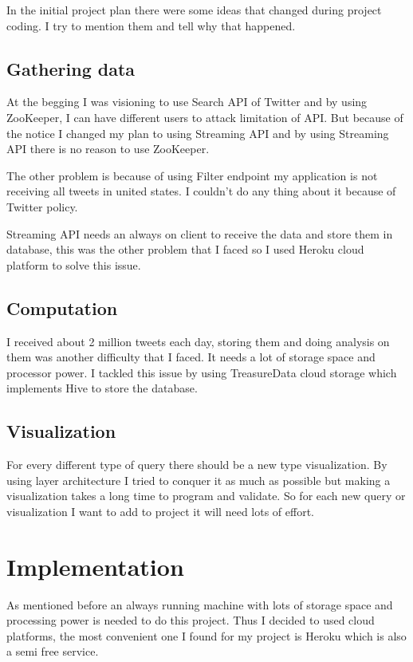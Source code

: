 \documentclass[a4paper,11pt]{report}
\begin{document}
In the initial project plan there were some ideas that changed during project coding. I try to mention them and tell why that happened.

\section{Gathering data}

At the begging I was visioning to use Search API of Twitter and by using ZooKeeper, I can have different users to attack limitation of API. But because of the notice I changed my plan to using Streaming API and by using Streaming API there is no reason to use ZooKeeper.

The other problem is because of using Filter endpoint my application is not receiving all tweets in united states. I couldn't do any thing about it because of Twitter policy.

Streaming API needs an always on client to receive the data and store them in database, this was the other problem that I faced so I used Heroku cloud platform to solve this issue.

\section{Computation}

I received about 2 million tweets each day, storing them and doing analysis on them was another difficulty that I faced. It needs a lot of storage space and processor power. I tackled this issue by using TreasureData cloud storage which implements Hive to store the database.

\section{Visualization}

For every different type of query there should be a new type visualization. By using layer architecture I tried to conquer it as much as possible but making a visualization takes a long time to program and validate. So for each new query or visualization I want to add to project it will need lots of effort.

\chapter{Implementation}

As mentioned before an always running machine with lots of storage space and processing power is needed to do this project. Thus I decided to used cloud platforms, the most convenient one I found for my project is Heroku which is also a semi free service.
\end{document}
